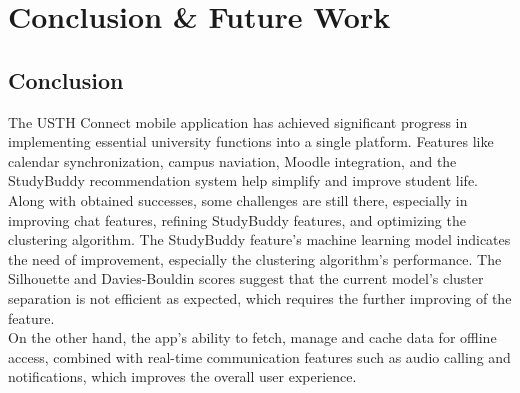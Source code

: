 \documentclass[12pt]{article}
\begin{document}

\pagebreak

\section{Conclusion {\&} Future Work}
\subsection{Conclusion}
The USTH Connect mobile application has achieved significant progress in implementing essential university functions into a single platform. Features like calendar synchronization, campus naviation, Moodle integration, and the StudyBuddy recommendation system help simplify and improve student life.
Along with obtained successes, some challenges are still there, especially in improving chat features, refining StudyBuddy features, and optimizing the clustering algorithm.
The StudyBuddy feature's machine learning model indicates the need of improvement, especially the clustering algorithm's performance. The Silhouette and Davies-Bouldin scores suggest that the current model's cluster separation is not efficient as expected, which requires the further improving of the feature. \\

On the other hand, the app's ability to fetch, manage and cache data for offline access, combined with real-time communication features such as audio calling and notifications, which improves the overall user experience. \\
\end{document}
